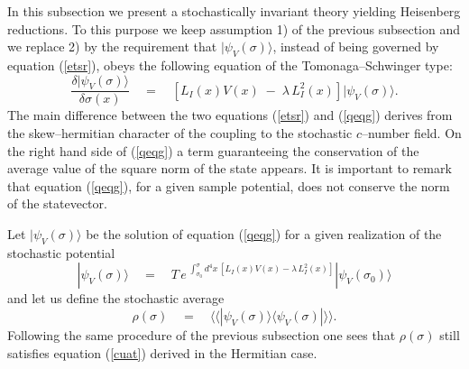 \documentclass[12pt]{article}
\newcommand{\llangle}{\langle\!\langle}
\newcommand{\rrangle}{\rangle\!\rangle}
\begin{document}
In this subsection we present a stochastically invariant theory
yielding Heisenberg reductions. To this purpose we keep assumption
1) of the previous subsection and we replace 2) by the requirement
that $|\psi_{V}(\sigma)\rangle$, instead of being governed by
equation (\ref{etsr}), obeys the following equation of the
Tomonaga--Schwinger type:
\begin{equation} \label{qeqg}
\frac{\delta |\psi_{V}(\sigma)\rangle}{\delta\sigma(x)} \quad =
\quad [L_{I}(x)V(x)\; - \; \lambda\, L_{I}^{2}(x)]
|\psi_{V}(\sigma)\rangle.
\end{equation}
The main difference between the two equations (\ref{etsr}) and
(\ref{qeqg}) derives from the skew--hermitian character of the
coupling to the stochastic $c$--number field. On the right hand
side of (\ref{qeqg}) a term guaranteeing the conservation of the
average value of the square norm of the state appears. It is
important to remark that equation (\ref{qeqg}), for a given sample
potential, does not conserve the norm of the statevector.

Let $|\psi_{V}(\sigma)\rangle$ be the solution of equation
(\ref{qeqg}) for a given realization of the stochastic potential
\begin{equation} \label{olhc}
|\psi_{V}(\sigma)\rangle \quad = \quad T\, e^{\displaystyle\;
\int_{\sigma_{0}}^{\sigma} d^{4}x\, [L_{I}(x) V(x) - \lambda\,
L_{I}^{2}(x)]} |\psi_{V}(\sigma_{0})\rangle
\end{equation}
and let us define the stochastic average
\begin{equation} \label{kjh}
\rho(\sigma) \quad = \quad \llangle|\psi_{V}(\sigma)\rangle
\langle\psi_{V}(\sigma)|\rrangle.
\end{equation}
Following the same procedure of the previous subsection one sees
that $\rho(\sigma)$ still satisfies equation (\ref{cuat}) derived
in the Hermitian case.
\end{document}
